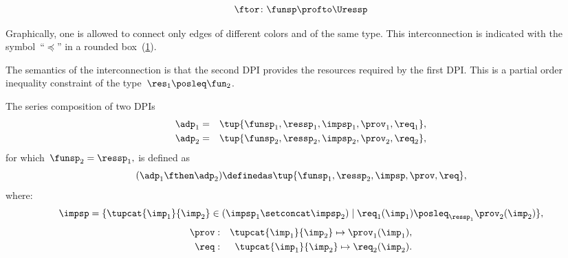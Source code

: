 {\begin{forslides}
        \begin{equation}
            \label{eq:dprob2}
            \ftor \colon \funsp \profto \Uressp
        \end{equation}
    \end{forslides}
}

Graphically, one is allowed to connect only edges of different colors and of the same type.
This interconnection is indicated with the symbol~``$\preceq$'' in a rounded box~(\cref{fig:connection}).

\begin{figure}[h]
    \centering
    \caption{}
    \label{fig:connection}
\end{figure}


The semantics of the interconnection is that the second DPI provides the resources required by the first DPI.
This is a partial order inequality constraint of the type~$\res_{1}\posleq\fun_{2}$.

\begin{definition}
    \label{def:series-composition}
    The series composition of two DPIs
    \begin{equation}
        \begin{aligned}
            \adp_{1}&=&\tup{\funsp_{1},\ressp_{1},\impsp_{1},\prov_{1},\req_{1}},
            \\
            \adp_{2}&=&\tup{\funsp_{2},\ressp_{2},\impsp_{2},\prov_{2},\req_{2}},
        \end{aligned}
    \end{equation}
    for which~$\funsp_{2}=\ressp_{1},$ is defined as
    \begin{equation}
    (\adp_{1} \fthen \adp_{2})
        \definedas
        \tup{ \funsp_{1},\ressp_{2},\impsp,\prov,\req},
    \end{equation}
    where:
    \begin{equation}
        \impsp  =  \{  \tupcat {\imp_{1}} {\imp_{2}} \in (\impsp_{1} \setconcat \impsp_{2})\mid\req_{1}(\imp_{1})\posleq_{\ressp_{1}}\prov_{2}(\imp_{2})\},
    \end{equation}
    \begin{equation}
        \begin{aligned}
            \prov & : & \tupcat {\imp_{1}} {\imp_{2}}   \mapsto\prov_{1}(\imp_{1}),\\
            \req & : & \tupcat {\imp_{1}} {\imp_{2}} \mapsto\req_{2}(\imp_{2}).
        \end{aligned}
    \end{equation}
\end{definition}

